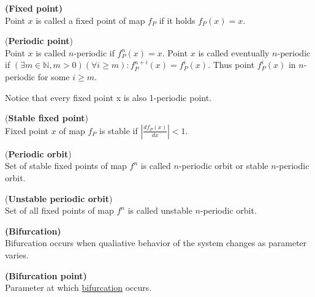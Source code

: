 \begin{definition} \textbf{(Fixed point)} \\
    \label{def:fixed point}
    Point $x$ is called a fixed point of map $f_P$ if it holds $f_P(x) = x$.
\end{definition}

\begin{definition} (\textbf{Periodic point})\\
    Point $x$ is called $n$-periodic if $f^{n}_P(x)=x$. Point $x$ is called eventually $n$-periodic if $(\exists m \in \mathbb{N}, m>0) (\forall i \geq m): f^{n+i}_P(x)=f^{i}_P(x)$.
    Thus point $f^{i}_P(x)$ in $n$-periodic for some $i \geq m$.
\end{definition}

\begin{remark}
    Notice that every fixed point x is also 1-periodic point.  
\end{remark}

\begin{definition} (\textbf{Stable fixed point})\\
    Fixed point $x$ of map $f_P$ is stable if $|\frac{d{f_P(x)}}{dx}| < 1$.
\end{definition}

\begin{definition} (\textbf{Periodic orbit})\\
    Set of stable fixed points of map $f^{n}$ is called $n$-periodic orbit or stable $n$-periodic orbit.
\end{definition}

\begin{definition} (\textbf{Unstable periodic orbit})\\
    Set of all fixed points of map $f^{n}$ is called unstable $n$-periodic orbit.
\end{definition}

\begin{definition} \textbf{(Bifurcation)} \\
    \label{def:bifurcation}
    Bifurcation occurs when qualiative behavior of the system changes as parameter varies.
\end{definition}

\begin{definition} \textbf{(Bifurcation point)} \\
    \label{def:bifurcation_point}
    Parameter at which \hyperref[def:bifurcation]{bifurcation} occurs.
\end{definition}

